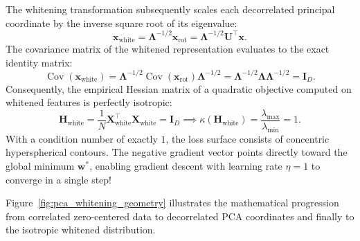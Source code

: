 \begin{itemize}[leftmargin=*]
    The whitening transformation subsequently scales each decorrelated principal coordinate by the inverse square root of its eigenvalue:
    \begin{equation}
    \mathbf{x}_{\text{white}} = \boldsymbol{\Lambda}^{-1/2} \mathbf{x}_{\text{rot}} = \boldsymbol{\Lambda}^{-1/2} \mathbf{U}^\top \mathbf{x}.
    \label{eq:whitening_transformation}
    \end{equation}
    The covariance matrix of the whitened representation evaluates to the exact identity matrix:
    \begin{equation}
    \operatorname{Cov}(\mathbf{x}_{\text{white}}) = \boldsymbol{\Lambda}^{-1/2} \operatorname{Cov}(\mathbf{x}_{\text{rot}}) \boldsymbol{\Lambda}^{-1/2} = \boldsymbol{\Lambda}^{-1/2} \boldsymbol{\Lambda} \boldsymbol{\Lambda}^{-1/2} = \mathbf{I}_D.
    \label{eq:whitened_identity_cov}
    \end{equation}
    Consequently, the empirical Hessian matrix of a quadratic objective computed on whitened features is perfectly isotropic:
    \begin{equation}
    \mathbf{H}_{\text{white}} = \frac{1}{N} \mathbf{X}_{\text{white}}^\top \mathbf{X}_{\text{white}} = \mathbf{I}_D \implies \kappa(\mathbf{H}_{\text{white}}) = \frac{\lambda_{\max}}{\lambda_{\min}} = 1.
    \end{equation}
    With a condition number of exactly $1$, the loss surface consists of concentric hyperspherical contours. The negative gradient vector points directly toward the global minimum $\mathbf{w}^*$, enabling gradient descent with learning rate $\eta = 1$ to converge in a single step!
\end{itemize}

Figure~\ref{fig:pca_whitening_geometry} illustrates the mathematical progression from correlated zero-centered data to decorrelated PCA coordinates and finally to the isotropic whitened distribution.

